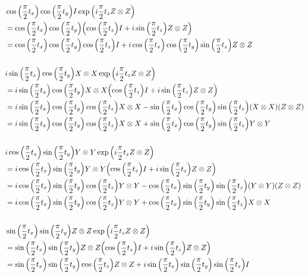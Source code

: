 \documentclass{article}
\begin{document}
\begin{align*}
  & \cos\pqty{\frac{\pi}{2}t_x}\cos\pqty{\frac{\pi}{2}t_y} I \exp\pqty{i\frac{\pi}{2}t_z Z\otimes Z} \\
  &= \cos\pqty{\frac{\pi}{2}t_x}\cos\pqty{\frac{\pi}{2}t_y}\pqty{\cos\pqty{\frac{\pi}{2}t_z} I + i\sin\pqty{\frac{\pi}{2}t_z} Z\otimes Z} \\
  &= \cos\pqty{\frac{\pi}{2}t_x}\cos\pqty{\frac{\pi}{2}t_y}\cos\pqty{\frac{\pi}{2}t_z} I + i\cos\pqty{\frac{\pi}{2}t_x}\cos\pqty{\frac{\pi}{2}t_y}\sin\pqty{\frac{\pi}{2}t_z} Z\otimes Z \\
  \\
  & i\sin\pqty{\frac{\pi}{2}t_x} \cos\pqty{\frac{\pi}{2}t_y} X\otimes X \exp\pqty{i\frac{\pi}{2}t_z Z\otimes Z} \\
  &= i\sin\pqty{\frac{\pi}{2}t_x} \cos\pqty{\frac{\pi}{2}t_y} X\otimes X \pqty{\cos\pqty{\frac{\pi}{2}t_z} I + i\sin\pqty{\frac{\pi}{2}t_z} Z\otimes Z} \\
  &= i\sin\pqty{\frac{\pi}{2}t_x} \cos\pqty{\frac{\pi}{2}t_y}\cos\pqty{\frac{\pi}{2}t_z} X\otimes X - \sin\pqty{\frac{\pi}{2}t_x} \cos\pqty{\frac{\pi}{2}t_y} \sin\pqty{\frac{\pi}{2}t_z} \pqty{X\otimes X}\pqty{Z\otimes Z} \\
  &= i\sin\pqty{\frac{\pi}{2}t_x} \cos\pqty{\frac{\pi}{2}t_y}\cos\pqty{\frac{\pi}{2}t_z} X\otimes X + \sin\pqty{\frac{\pi}{2}t_x} \cos\pqty{\frac{\pi}{2}t_y} \sin\pqty{\frac{\pi}{2}t_z} Y\otimes Y \\
  \\
  & i\cos\pqty{\frac{\pi}{2}t_x}\sin\pqty{\frac{\pi}{2}t_y} Y\otimes Y \exp\pqty{i\frac{\pi}{2}t_z Z\otimes Z} \\
  &= i\cos\pqty{\frac{\pi}{2}t_x}\sin\pqty{\frac{\pi}{2}t_y} Y\otimes Y \pqty{\cos\pqty{\frac{\pi}{2}t_z} I + i\sin\pqty{\frac{\pi}{2}t_z} Z\otimes Z} \\
  &= i\cos\pqty{\frac{\pi}{2}t_x}\sin\pqty{\frac{\pi}{2}t_y}\cos\pqty{\frac{\pi}{2}t_z} Y\otimes Y - \cos\pqty{\frac{\pi}{2}t_x}\sin\pqty{\frac{\pi}{2}t_y}\sin\pqty{\frac{\pi}{2}t_z} \pqty{Y\otimes Y}\pqty{Z\otimes Z} \\
  &= i\cos\pqty{\frac{\pi}{2}t_x}\sin\pqty{\frac{\pi}{2}t_y}\cos\pqty{\frac{\pi}{2}t_z} Y\otimes Y + \cos\pqty{\frac{\pi}{2}t_x}\sin\pqty{\frac{\pi}{2}t_y}\sin\pqty{\frac{\pi}{2}t_z} X\otimes X \\
  \\
  & \sin\pqty{\frac{\pi}{2}t_x} \sin\pqty{\frac{\pi}{2}t_y} Z\otimes Z \exp\pqty{i\frac{\pi}{2}t_z Z\otimes Z} \\
  &= \sin\pqty{\frac{\pi}{2}t_x} \sin\pqty{\frac{\pi}{2}t_y} Z\otimes Z \pqty{\cos\pqty{\frac{\pi}{2}t_z} I + i\sin\pqty{\frac{\pi}{2}t_z} Z\otimes Z} \\
  &= \sin\pqty{\frac{\pi}{2}t_x}\sin\pqty{\frac{\pi}{2}t_y}\cos\pqty{\frac{\pi}{2}t_z} Z\otimes Z + i\sin\pqty{\frac{\pi}{2}t_x}\sin\pqty{\frac{\pi}{2}t_y}\sin\pqty{\frac{\pi}{2}t_z} I \\
\end{align*}
\end{document}
